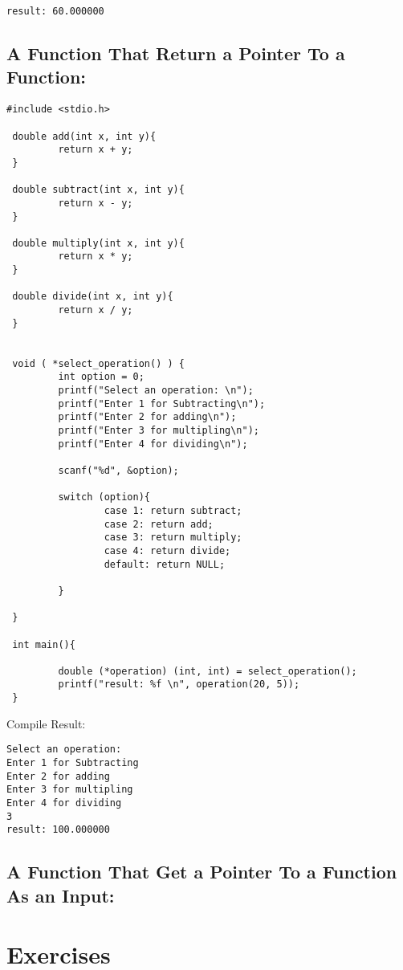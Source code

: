 \begin{lstlisting} 
result: 60.000000
\end{lstlisting}

\subsection{A Function That Return a Pointer To a Function:}
\begin{lstlisting} 
#include <stdio.h>

 double add(int x, int y){
         return x + y;
 }

 double subtract(int x, int y){
         return x - y;
 }

 double multiply(int x, int y){
         return x * y;
 }

 double divide(int x, int y){
         return x / y;
 }


 void ( *select_operation() ) {
         int option = 0;
         printf("Select an operation: \n");
         printf("Enter 1 for Subtracting\n");
         printf("Enter 2 for adding\n");
         printf("Enter 3 for multipling\n");
         printf("Enter 4 for dividing\n");

         scanf("%d", &option);

         switch (option){
                 case 1: return subtract;
                 case 2: return add;
                 case 3: return multiply;
                 case 4: return divide;
                 default: return NULL;

         }

 }

 int main(){

         double (*operation) (int, int) = select_operation();
         printf("result: %f \n", operation(20, 5));
 }
\end{lstlisting}
Compile Result:
\begin{lstlisting} 
Select an operation:
Enter 1 for Subtracting
Enter 2 for adding
Enter 3 for multipling
Enter 4 for dividing
3
result: 100.000000
\end{lstlisting}

\subsection{A Function That Get a Pointer To a Function As an Input:}
\section{Exercises}